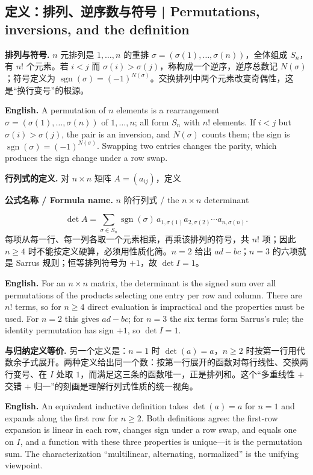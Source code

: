 \documentclass[UTF8,11pt,a4paper]{ctexart}
\newcommand{\EN}[1]{\par\noindent\textbf{English.} #1\par}
\newcommand{\FORMULA}[2]{\par\noindent\textbf{公式名称 / Formula name.} #1 / #2\par}
\begin{document}
\subsection{定义：排列、逆序数与符号 | Permutations, inversions, and the definition}
\noindent\textbf{排列与符号.} $n$ 元排列是 $1,\dots,n$ 的重排 $\sigma=(\sigma(1),\dots,\sigma(n))$，全体组成 $S_n$，有 $n!$ 个元素。若 $i<j$ 而 $\sigma(i)>\sigma(j)$，称构成一个逆序，逆序总数记 $N(\sigma)$；符号定义为 $\operatorname{sgn}(\sigma)=(-1)^{N(\sigma)}$。交换排列中两个元素改变奇偶性，这是“换行变号”的根源。
\EN{A permutation of $n$ elements is a rearrangement $\sigma=(\sigma(1),\dots,\sigma(n))$ of $1,\dots,n$; all form $S_n$ with $n!$ elements. If $i<j$ but $\sigma(i)>\sigma(j)$, the pair is an inversion, and $N(\sigma)$ counts them; the sign is $\operatorname{sgn}(\sigma)=(-1)^{N(\sigma)}$. Swapping two entries changes the parity, which produces the sign change under a row swap.}
\noindent\textbf{行列式的定义.} 对 $n\times n$ 矩阵 $A=(a_{ij})$，定义
\FORMULA{$n$ 阶行列式}{the $n\times n$ determinant}
\[
\det A=\sum_{\sigma\in S_n}\operatorname{sgn}(\sigma)\,a_{1,\sigma(1)}a_{2,\sigma(2)}\cdots a_{n,\sigma(n)}.
\]
每项从每一行、每一列各取一个元素相乘，再乘该排列的符号，共 $n!$ 项；因此 $n\ge4$ 时不能按定义硬算，必须用性质化简。$n=2$ 给出 $ad-bc$；$n=3$ 的六项就是 Sarrus 规则；恒等排列符号为 $+1$，故 $\det I=1$。
\EN{For an $n\times n$ matrix, the determinant is the signed sum over all permutations of the products selecting one entry per row and column. There are $n!$ terms, so for $n\ge4$ direct evaluation is impractical and the properties must be used. For $n=2$ this gives $ad-bc$; for $n=3$ the six terms form Sarrus's rule; the identity permutation has sign $+1$, so $\det I=1$.}
\noindent\textbf{与归纳定义等价.} 另一个定义是：$n=1$ 时 $\det(a)=a$，$n\ge2$ 时按第一行用代数余子式展开。两种定义给出同一个数：按第一行展开的函数对每行线性、交换两行变号、在 $I$ 处取 $1$，而满足这三条的函数唯一，正是排列和。这个“多重线性 + 交错 + 归一”的刻画是理解行列式性质的统一视角。
\EN{An equivalent inductive definition takes $\det(a)=a$ for $n=1$ and expands along the first row for $n\ge2$. Both definitions agree: the first-row expansion is linear in each row, changes sign under a row swap, and equals one on $I$, and a function with these three properties is unique---it is the permutation sum. The characterization ``multilinear, alternating, normalized'' is the unifying viewpoint.}
\end{document}

